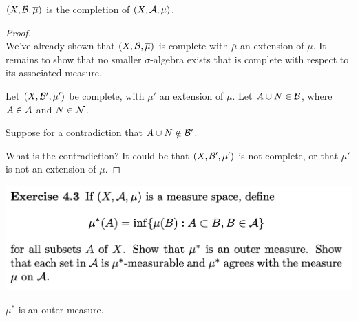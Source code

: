 \begin{claim*}
  $(X, \mathcal B, \overline{\mu})$ is the completion of $(X, \mathcal A, \mu)$.
\end{claim*}

\begin{proof}~\\
  We've already shown that $(X, \mathcal B, \overline\mu)$ is complete with $\bar{\mu}$ an extension of $\mu$. It remains
  to show that no smaller $\sigma$-algebra exists that is complete with respect to its associated measure.

  Let $(X, \mathcal B', \mu')$ be complete, with $\mu'$ an extension of $\mu$. Let $A \cup N \in \mathcal B$,
  where $A \in \mathcal A$ and $N \in \mathcal N$.

  Suppose for a contradiction that $A \cup N \notin \mathcal B'$.

  What is the contradiction? It could be that $(X, \mathcal B', \mu')$ is not complete, or that $\mu'$ is not an
  extension of $\mu$.

\end{proof}

\newpage
\begin{mdframed}
  \includegraphics[width=400pt]{img/analysis--berkeley-202a-hw-0d98.png}
\end{mdframed}

\begin{claim*}
  $\mu^*$ is an outer measure.
\end{claim*}

